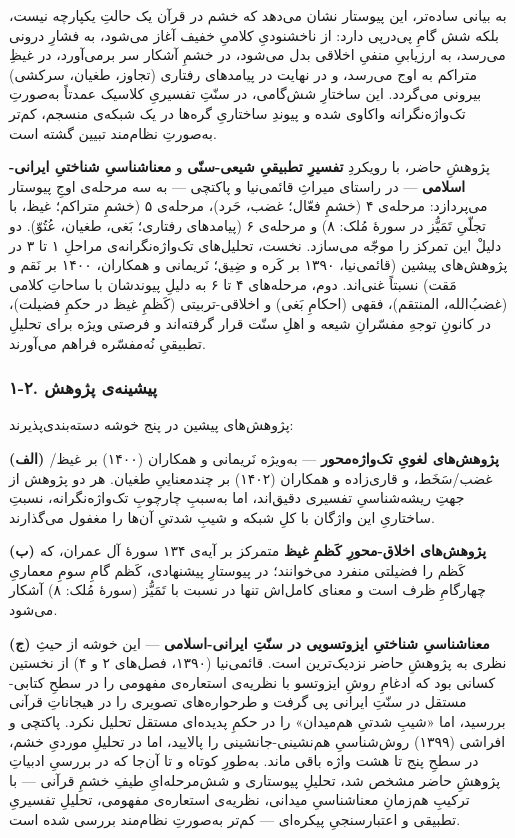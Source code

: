 \begin{RTL}
\begin{otherlanguage}{persian}
به بیانی ساده‌تر، این پیوستار نشان می‌دهد که خشم در قرآن یک حالتِ یکپارچه
نیست، بلکه شش گامِ پی‌درپی دارد: از ناخشنودیِ کلامیِ خفیف آغاز می‌شود، به
فشارِ درونی می‌رسد، به ارزیابیِ منفیِ اخلاقی بدل می‌شود، در خشمِ آشکار سر
برمی‌آورد، در غیظِ متراکم به اوج می‌رسد، و در نهایت در پیامدهای رفتاری
(تجاوز، طغیان، سرکشی) بیرونی می‌گردد. این ساختارِ شش‌گامی، در سنّتِ تفسیریِ
کلاسیک عمدتاً به‌صورتِ تک‌واژه‌نگرانه واکاوی شده و پیوندِ ساختاریِ گره‌ها در یک
شبکه‌ی منسجم، کم‌تر به‌صورتِ نظام‌مند تبیین گشته است.

پژوهشِ حاضر، با رویکردِ \textbf{تفسیرِ تطبیقیِ شیعی-سنّی} و \textbf{معناشناسیِ
شناختیِ ایرانی-اسلامی} --- در راستای میراثِ قائمی‌نیا و پاکتچی --- به سه
مرحله‌ی اوجِ پیوستار می‌پردازد: مرحله‌ی ۴ (خشمِ فعّال؛ غضب، حَرد)، مرحله‌ی ۵
(خشمِ متراکم؛ غیظ، با تجلّیِ تَمَیُّز در سورۀ مُلک: ۸) و مرحله‌ی ۶ (پیامدهای
رفتاری؛ بَغی، طغیان، عُتُوّ). دو دلیلْ این تمرکز را موجّه می‌سازد. نخست،
تحلیل‌های تک‌واژه‌نگرانه‌ی مراحلِ ۱ تا ۳ در پژوهش‌های پیشین (قائمی‌نیا، ۱۳۹۰ بر
کَره و ضِیق؛ نَریمانی و همکاران، ۱۴۰۰ بر نَقم و مَقت) نسبتاً غنی‌اند. دوم،
مرحله‌های ۴ تا ۶ به دلیلِ پیوندشان با ساحاتِ کلامی (غضبُ‌الله، المنتقم)، فقهی
(احکامِ بَغی) و اخلاقی-تربیتی (کَظمِ غیظ در حکمِ فضیلت)، در کانونِ توجهِ مفسّرانِ
شیعه و اهلِ سنّت قرار گرفته‌اند و فرصتی ویژه برای تحلیلِ تطبیقیِ نُه‌مفسّره
فراهم می‌آورند.

\subsubsection{۱-۲. پیشینه‌ی
پژوهش}\label{ux67eux6ccux634ux6ccux646ux647ux6cc-ux67eux698ux648ux647ux634}

پژوهش‌های پیشین در پنج خوشه دسته‌بندی‌پذیرند:

\textbf{(الف) پژوهش‌های لغویِ تک‌واژه‌محور} --- به‌ویژه نَریمانی و همکاران
(۱۴۰۰) بر غیظ/غضب/سَخَط، و قاری‌زاده و همکاران (۱۴۰۲) بر چندمعناییِ طغیان.
هر دو پژوهش از جهتِ ریشه‌شناسیِ تفسیری دقیق‌اند، اما به‌سببِ چارچوبِ
تک‌واژه‌نگرانه، نسبتِ ساختاریِ این واژگان با کلِ شبکه و شیبِ شدتیِ آن‌ها را
مغفول می‌گذارند.

\textbf{(ب) پژوهش‌های اخلاق-محورِ کَظمِ غیظ} متمرکز بر آیه‌ی ۱۳۴ سورۀ آل
عمران، که کَظم را فضیلتی منفرد می‌خوانند؛ در پیوستارِ پیشنهادی، کَظم گامِ سومِ
معماریِ چهارگامِ ظرف است و معنای کامل‌اش تنها در نسبت با تَمَیُّز (سورۀ مُلک: ۸)
آشکار می‌شود.

\textbf{(ج) معناشناسیِ شناختیِ ایزوتسویی در سنّتِ ایرانی-اسلامی} --- این
خوشه از حیثِ نظری به پژوهشِ حاضر نزدیک‌ترین است. قائمی‌نیا (۱۳۹۰، فصل‌های ۲ و
۴) از نخستین کسانی بود که ادغامِ روشِ ایزوتسو با نظریه‌ی استعاره‌ی مفهومی را
در سطحِ کتابی-مستقل در سنّتِ ایرانی پی گرفت و طرحواره‌های تصویری را در
هیجاناتِ قرآنی بررسید، اما «شیبِ شدتیِ هم‌میدان» را در حکمِ پدیده‌ای مستقل
تحلیل نکرد. پاکتچی و افراشی (۱۳۹۹) روش‌شناسیِ هم‌نشینی-جانشینی را پالایید،
اما در تحلیلِ موردیِ خشم، در سطحِ پنج تا هشت واژه باقی ماند. به‌طورِ کوتاه و
تا آن‌جا که در بررسیِ ادبیاتِ پژوهشِ حاضر مشخص شد، تحلیلِ پیوستاری و
شش‌مرحله‌ایِ طیفِ خشمِ قرآنی --- با ترکیبِ هم‌زمانِ معناشناسیِ میدانی، نظریه‌ی
استعاره‌ی مفهومی، تحلیلِ تفسیریِ تطبیقی و اعتبارسنجیِ پیکره‌ای --- کم‌تر
به‌صورتِ نظام‌مند بررسی شده است.


\end{otherlanguage}
\end{RTL}
